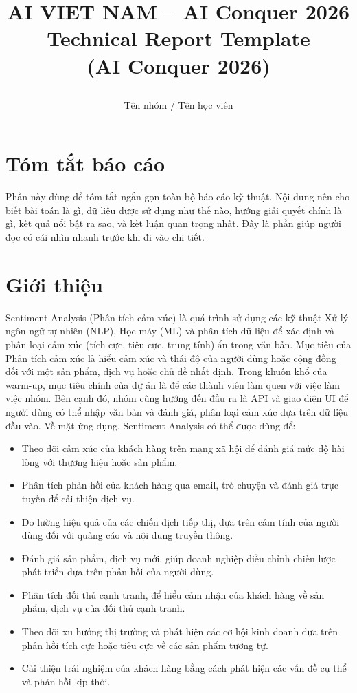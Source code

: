 \documentclass[12pt]{ai_conquer2026}
\title{%
  \begin{center}
        \Large {AI VIET NAM -- AI Conquer 2026}\\[.5ex]  
        \Huge \textbf{Technical Report Template \\ 
        (AI Conquer 2026)}\\[.5ex]
  \end{center}
}
\author{
        \begin{minipage}{\textwidth}
        \centering
        {
        \vspace{-1.5em}
          Tên nhóm / Tên học viên
        }\\
      \end{minipage}
    }
\date{}
\begin{document}
\maketitle
\vspace{-5.5em}
\setlength{\epigraphwidth}{0.6\textwidth}

\section{Tóm tắt báo cáo}

Phần này dùng để tóm tắt ngắn gọn toàn bộ báo cáo kỹ thuật. Nội dung nên cho biết bài toán là gì, dữ liệu được sử dụng như thế nào, hướng giải quyết chính là gì, kết quả nổi bật ra sao, và kết luận quan trọng nhất. Đây là phần giúp người đọc có cái nhìn nhanh trước khi đi vào chi tiết.

\newpage
\setcounter{tocdepth}{2}
\tableofcontents
\thispagestyle{fancy}

\newpage
\section{Giới thiệu}

Sentiment Analysis (Phân tích cảm xúc) là quá trình sử dụng các kỹ thuật Xử lý ngôn ngữ tự nhiên (NLP), Học máy (ML) và phân tích dữ liệu để xác định và phân loại cảm xúc (tích cực, tiêu cực, trung tính) ẩn trong văn bản. Mục tiêu của Phân tích cảm xúc là hiểu cảm xúc và thái độ của người dùng hoặc cộng đồng đối với một sản phẩm, dịch vụ hoặc chủ đề nhất định. 
Trong khuôn khổ của warm-up, mục tiêu chính của dự án là để các thành viên làm quen với việc làm việc nhóm. Bên cạnh đó, nhóm cũng hướng đến đầu ra là API và giao diện UI để người dùng có thể nhập văn bản và đánh giá, phân loại cảm xúc dựa trên dữ liệu đầu vào.
Về mặt ứng dụng, Sentiment Analysis có thể được dùng để:
\begin{itemize}
    \item Theo dõi cảm xúc của khách hàng trên mạng xã hội để đánh giá mức độ hài lòng với thương hiệu hoặc sản phẩm.
    \item Phân tích phản hồi của khách hàng qua email, trò chuyện và đánh giá trực tuyến để cải thiện dịch vụ.
    \item Đo lường hiệu quả của các chiến dịch tiếp thị, dựa trên cảm tính của người dùng đối với quảng cáo và nội dung truyền thông.
    \item Đánh giá sản phẩm, dịch vụ mới, giúp doanh nghiệp điều chỉnh chiến lược phát triển dựa trên phản hồi của người dùng.
    \item Phân tích đối thủ cạnh tranh, để hiểu cảm nhận của khách hàng về sản phẩm, dịch vụ của đối thủ cạnh tranh.
    \item Theo dõi xu hướng thị trường và phát hiện các cơ hội kinh doanh dựa trên phản hồi tích cực hoặc tiêu cực về các sản phẩm tương tự.
    \item Cải thiện trải nghiệm của khách hàng bằng cách phát hiện các vấn đề cụ thể và phản hồi kịp thời.
\end{itemize}
\end{document}
